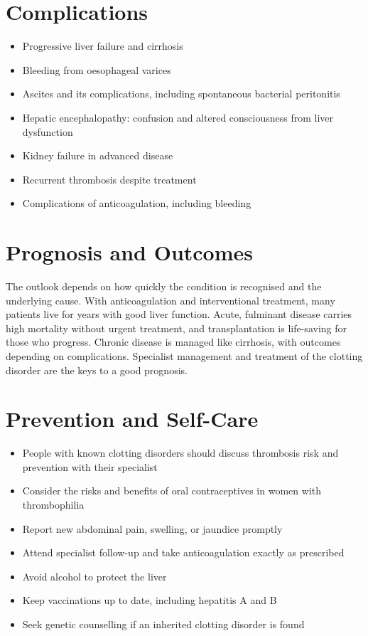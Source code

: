 \section*{Complications}
\begin{itemize}
    \item Progressive liver failure and cirrhosis
    \item Bleeding from oesophageal varices
    \item Ascites and its complications, including spontaneous bacterial peritonitis
    \item Hepatic encephalopathy: confusion and altered consciousness from liver dysfunction
    \item Kidney failure in advanced disease
    \item Recurrent thrombosis despite treatment
    \item Complications of anticoagulation, including bleeding
\end{itemize}

\section*{Prognosis and Outcomes}
The outlook depends on how quickly the condition is recognised and the underlying cause. With anticoagulation and interventional treatment, many patients live for years with good liver function. Acute, fulminant disease carries high mortality without urgent treatment, and transplantation is life-saving for those who progress. Chronic disease is managed like cirrhosis, with outcomes depending on complications. Specialist management and treatment of the clotting disorder are the keys to a good prognosis.

\section*{Prevention and Self-Care}
\begin{itemize}
    \item People with known clotting disorders should discuss thrombosis risk and prevention with their specialist
    \item Consider the risks and benefits of oral contraceptives in women with thrombophilia
    \item Report new abdominal pain, swelling, or jaundice promptly
    \item Attend specialist follow-up and take anticoagulation exactly as prescribed
    \item Avoid alcohol to protect the liver
    \item Keep vaccinations up to date, including hepatitis A and B
    \item Seek genetic counselling if an inherited clotting disorder is found
\end{itemize}

